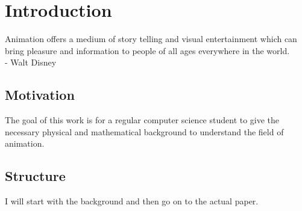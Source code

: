 \chapter{Introduction}
Animation offers a medium of story telling and visual entertainment which can bring pleasure and information to people of all ages everywhere in the world.
\\ - Walt Disney

\section{Motivation}
The goal of this work is for a regular computer science student to give the necessary physical and mathematical background to understand the field of animation.

\section{Structure}
I will start with the background and then go on to the actual paper.